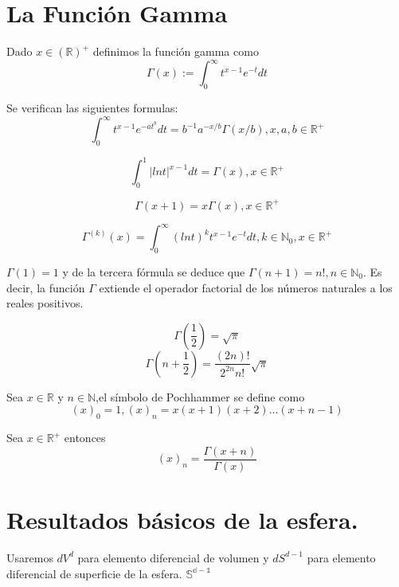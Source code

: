 
\chapter{La Función Gamma}\label{aped.A}
\begin{defn} Dado $x\in\mathds{(R)^+}$ definimos la función gamma como
	$$
	\Gamma(x) := \int_{0}^{\infty} t^{x-1}e^{-t}dt		
	$$
\end{defn}
\begin{prop}Se verifican las siguientes formulas:
	$$
	\int_{0}^{\infty}  t^{x-1}e^{-at^b}dt = b^{-1}a^{-x/b}\Gamma(x/b)  , x,a,b \in \mathds{R}^+
	$$
	
	$$
	\int_{0}^{1} |ln t|^{x-1}dt = \Gamma(x),   x \in \mathds{R}^+
	$$
	
	$$
	\Gamma(x+1) = x \Gamma(x) ,		x\in \mathds{R}^+
	$$
	
	$$
	\Gamma^{(k)}(x) = \int_{0}^{\infty} (ln t)^k t^{x-1} e^{-t} dt,   k\in\mathds{N}_0,x\in\mathds{R}^+
	$$
\end{prop}
\begin{rem}
	$\Gamma(1)=1$ y de la tercera fórmula se deduce que $\Gamma(n+1)=n!, n\in\mathds{N}_0$. Es decir, la función $\Gamma$ extiende el operador factorial de los números naturales a los reales positivos.
\end{rem}
\begin{lem} 
	$$
	\Gamma(\frac{1}{2}) = 	\sqrt{\pi}
	$$
	$$
	\Gamma(n+\frac{1}{2})=\frac{(2n)!}{2^{2n}n!} \sqrt{\pi}
	$$
\end{lem}
\begin{defn}Sea $x\in\mathds{R}$ y $n\in\mathds{N}$,el símbolo de Pochhammer se define como
	$$
	(x)_0 = 1, (x)_n=x(x+1)(x+2)...(x+n-1)
	$$
\end{defn}
\begin{prop} Sea $x\in\mathds{R}^+$ entonces
	$$
	(x)_n = \frac{\Gamma(x+n)}{\Gamma(x)}
	$$
\end{prop}
\chapter{Resultados básicos de la esfera.}\label{aped.B}
Usaremos $dV^d$ para elemento diferencial de volumen y $dS^{d-1}$ para elemento diferencial de superficie de la esfera.  $\mathds{S^{d-1}}$

